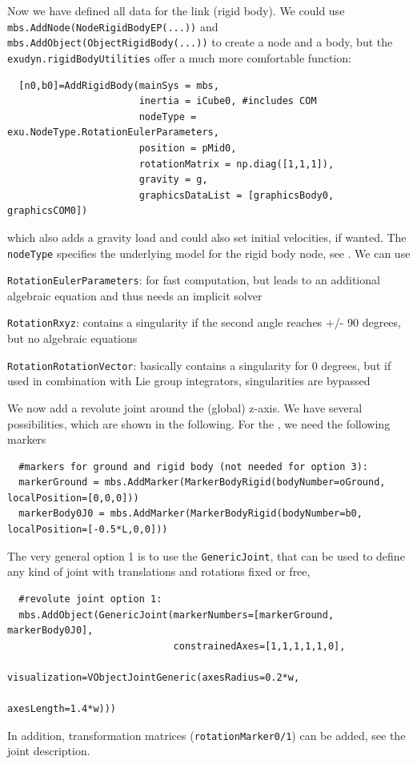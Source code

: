 \noindent Now we have defined all data for the link (rigid body). We could use \texttt{mbs.AddNode(NodeRigidBodyEP(...))} and \texttt{mbs.AddObject(ObjectRigidBody(...))} to create a node and a body, but the \texttt{exudyn.rigidBodyUtilities} offer a much more comfortable function:
\pythonstyle\begin{lstlisting}
  [n0,b0]=AddRigidBody(mainSys = mbs,
                       inertia = iCube0, #includes COM
                       nodeType = exu.NodeType.RotationEulerParameters,
                       position = pMid0,
                       rotationMatrix = np.diag([1,1,1]),
                       gravity = g,
                       graphicsDataList = [graphicsBody0, graphicsCOM0])
\end{lstlisting}
which also adds a gravity load and could also set initial velocities, if wanted. 
The \texttt{nodeType} specifies the underlying model for the rigid body node, see .
We can use 
\bi
\item \texttt{RotationEulerParameters}: for fast computation, but leads to an additional algebraic equation and thus needs an implicit solver
\item \texttt{RotationRxyz}: contains a singularity if the second angle reaches +/- 90 degrees, but no algebraic equations
\item \texttt{RotationRotationVector}: basically contains a singularity for 0 degrees, but if used in combination with Lie group integrators, singularities are bypassed
\ei

\noindent We now add a revolute joint around the (global) z-axis. 
We have several possibilities, which are shown in the following.
For the , we need the following markers
\pythonstyle\begin{lstlisting}
  #markers for ground and rigid body (not needed for option 3):
  markerGround = mbs.AddMarker(MarkerBodyRigid(bodyNumber=oGround, localPosition=[0,0,0]))
  markerBody0J0 = mbs.AddMarker(MarkerBodyRigid(bodyNumber=b0, localPosition=[-0.5*L,0,0]))
\end{lstlisting}

\noindent The very general option 1 is to use the \texttt{GenericJoint}, that can be used to define any kind of joint with translations and rotations fixed or free,
\pythonstyle\begin{lstlisting}
  #revolute joint option 1:
  mbs.AddObject(GenericJoint(markerNumbers=[markerGround, markerBody0J0], 
                             constrainedAxes=[1,1,1,1,1,0],
                             visualization=VObjectJointGeneric(axesRadius=0.2*w, 
                                                               axesLength=1.4*w)))
\end{lstlisting}
In addition, transformation matrices (\texttt{rotationMarker0/1}) can be added, see the joint description.

